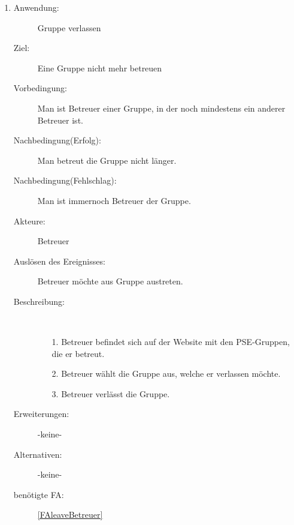 \documentclass[parskip=full]{scrartcl}
\newcommand{\swtLabel}[1]{\textbf{/#1\arabic*0/}}
\begin{document}
\begin{enumerate} [label=\swtLabel{B}]
   
  
  \item
	\begin{description}
  		\item[Anwendung:] Gruppe verlassen
  		\item[Ziel:] Eine Gruppe nicht mehr betreuen
  		\item[Vorbedingung:] Man ist Betreuer einer Gruppe, in der noch mindestens
  		ein anderer Betreuer ist.
  		\item[Nachbedingung(Erfolg):] Man betreut die Gruppe nicht länger.
  		\item[Nachbedingung(Fehlschlag):] Man ist immernoch Betreuer der Gruppe.
  		\item[Akteure:] Betreuer
  		\item[Auslösen des Ereignisses:] Betreuer möchte aus Gruppe austreten.
  		\item[Beschreibung:]~
  	\begin{enumerate} 
  	  \item[1.] Betreuer befindet sich auf der Website mit den \gls{PSE}-Gruppen, die
  	  er betreut.
  	  \item[2.] Betreuer wählt die Gruppe aus, welche er verlassen möchte.
  	  \item[3.] Betreuer verlässt die Gruppe.
  	\end{enumerate}
  	\item[Erweiterungen:] -keine-
  	\item[Alternativen:] -keine-
  	\item[benötigte FA:] \ref{FAleaveBetreuer}
  \end{description}
   

\end{enumerate}
\end{document}
